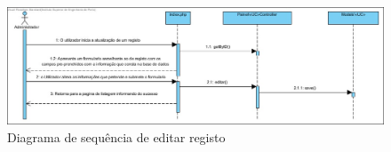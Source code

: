 \begin{figure}[H] 
	\begin{center}
		\includegraphics[width=\textwidth,keepaspectratio]{figuras/Diagramas_vp/SD_Painel_3_Editar.jpg}
		\caption{Diagrama de sequência de editar registo}
		\label{fig:sd_editar} 
	\end{center}
\end{figure}